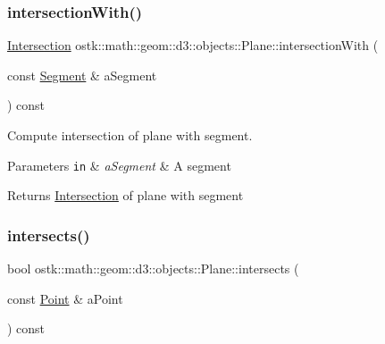 \subsubsection{\texorpdfstring{intersection\+With()}{intersectionWith()}\hspace{0.1cm}{\footnotesize\ttfamily [5/5]}}
{\footnotesize\ttfamily \hyperlink{classostk_1_1math_1_1geom_1_1d3_1_1_intersection}{Intersection} ostk\+::math\+::geom\+::d3\+::objects\+::\+Plane\+::intersection\+With (\begin{DoxyParamCaption}\item[{const \hyperlink{classostk_1_1math_1_1geom_1_1d3_1_1objects_1_1_segment}{Segment} \&}]{a\+Segment }\end{DoxyParamCaption}) const}



Compute intersection of plane with segment. 


\begin{DoxyParams}[1]{Parameters}
\mbox{\tt in}  & {\em a\+Segment} & A segment \\
\hline
\end{DoxyParams}
\begin{DoxyReturn}{Returns}
\hyperlink{classostk_1_1math_1_1geom_1_1d3_1_1_intersection}{Intersection} of plane with segment 
\end{DoxyReturn}
\mbox{\label{classostk_1_1math_1_1geom_1_1d3_1_1objects_1_1_plane_aa41d142fb1459952aef497936d351081}} 
\subsubsection{\texorpdfstring{intersects()}{intersects()}\hspace{0.1cm}{\footnotesize\ttfamily [1/5]}}
{\footnotesize\ttfamily bool ostk\+::math\+::geom\+::d3\+::objects\+::\+Plane\+::intersects (\begin{DoxyParamCaption}\item[{const \hyperlink{classostk_1_1math_1_1geom_1_1d3_1_1objects_1_1_point}{Point} \&}]{a\+Point }\end{DoxyParamCaption}) const}



